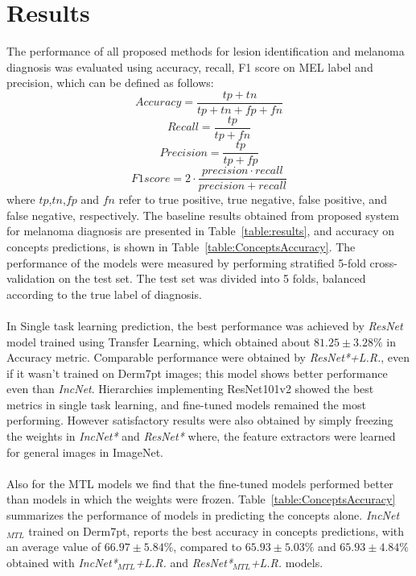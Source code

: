 \section{Results}
The performance of all proposed methods for lesion identification and melanoma diagnosis was evaluated using accuracy, recall, F1 score on MEL label and precision, which can be defined as follows:
\begin{equation}
    Accuracy = \frac{tp + tn}{tp + tn + fp +fn}
\end{equation}
\begin{equation}
    Recall = \frac{tp}{tp +fn}
\end{equation}
\begin{equation}
    Precision = \frac{tp}{tp + fp}
\end{equation}
\begin{equation}
    F1 score =2 \cdot \frac{precision \cdot recall}{precision + recall}
\end{equation}
where $tp$,$tn$,$fp$ and $fn$ refer to true positive, true negative, false positive, and false negative, respectively. The baseline results obtained from proposed system for melanoma diagnosis are presented in Table~\ref{table:results}, and accuracy on concepts predictions, is shown in Table~\ref{table:ConceptsAccuracy}.
The performance of the models were measured by performing stratified 5-fold cross-validation on the test set. The test set was divided into 5 folds, balanced according to the true label of diagnosis.\\ \\
In Single task learning prediction, the best performance was achieved by \emph{ResNet} model trained using Transfer Learning, which obtained about $81.25\pm3.28\%$ in Accuracy metric. Comparable performance were obtained by \emph{ResNet*+L.R.}, even if it wasn't trained on Derm7pt images; this model shows better performance even than \emph{IncNet}. Hierarchies implementing ResNet101v2 showed the best metrics in single task learning, and fine-tuned models remained the most performing. However satisfactory results were also obtained by simply freezing the weights in \emph{IncNet*} and \emph{ResNet*} where, the feature extractors were learned for general images in ImageNet. \\\\
Also for the MTL models we find that the fine-tuned models performed better than models in which the weights were frozen. Table~\ref{table:ConceptsAccuracy} summarizes the performance of models in predicting the concepts alone. \emph{IncNet$_{MTL}$} trained on Derm7pt, reports the best accuracy in concepts predictions, with an average value of $66.97 \pm5.84\%$, compared to $65.93\pm5.03\%$ and $65.93\pm4.84  \%$ obtained with \emph{IncNet*$_{MTL}$+L.R.} and \emph{ResNet*$_{MTL}$+L.R.} models.\\\\
